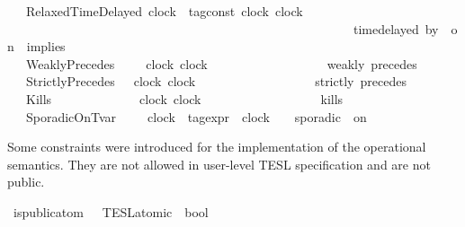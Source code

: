 \begin{isabellebody}
\ \ {\isacharbar}\ RelaxedTimeDelayed\ {\isacartoucheopen}clock{\isacartoucheclose}\ {\isacartoucheopen}{\isacharprime}{\isasymtau}\ tag{\isacharunderscore}const{\isacartoucheclose}\ {\isacartoucheopen}clock{\isacartoucheclose}\ {\isacartoucheopen}clock{\isacartoucheclose}\isanewline
\ \ \ \ \ \ \ \ \ \ \ \ \ \ \ \ \ \ \ \ \ \ \ \ \ \ \ \ \ \ \ \ \ \ \ \ \ \ \ \ \ \ \ \ \ \ \ \ \ \ \ \ \ \ {\isacharparenleft}{\isacartoucheopen}{\isacharunderscore}\ time{\isacharminus}delayed{\isasymbowtie}\ by\ {\isacharunderscore}\ on\ {\isacharunderscore}\ implies\ {\isacharunderscore}{\isacartoucheclose}\ {}{}{\isacharparenright}\isanewline
\ \ {\isacharbar}\ WeaklyPrecedes\ \ \ \ \ {\isacartoucheopen}clock{\isacartoucheclose}\ {\isacartoucheopen}clock{\isacartoucheclose}\ \ \ \ \ \ \ \ \ \ \ \ \ \ \ \ \ \ {\isacharparenleft}\ {\isacartoucheopen}weakly\ precedes{\isacartoucheclose}\ {}{}{\isacharparenright}\isanewline
\ \ {\isacharbar}\ StrictlyPrecedes\ \ \ {\isacartoucheopen}clock{\isacartoucheclose}\ {\isacartoucheopen}clock{\isacartoucheclose}\ \ \ \ \ \ \ \ \ \ \ \ \ \ \ \ \ \ {\isacharparenleft}\ {\isacartoucheopen}strictly\ precedes{\isacartoucheclose}\ {}{}{\isacharparenright}\isanewline
\ \ {\isacharbar}\ Kills\ \ \ \ \ \ \ \ \ \ \ \ \ \ {\isacartoucheopen}clock{\isacartoucheclose}\ {\isacartoucheopen}clock{\isacartoucheclose}\ \ \ \ \ \ \ \ \ \ \ \ \ \ \ \ \ \ {\isacharparenleft}\ {\isacartoucheopen}kills{\isacartoucheclose}\ {}{}{\isacharparenright}\isanewline
%
\isanewline
\ \ {\isacharbar}\ SporadicOnTvar\ \ \ \ \ {\isacartoucheopen}clock{\isacartoucheclose}\ {\isacartoucheopen}{\isacharprime}{\isasymtau}\ tag{\isacharunderscore}expr{\isacartoucheclose}\ \ {\isacartoucheopen}clock{\isacartoucheclose}\ \ \ {\isacharparenleft}{\isacartoucheopen}{\isacharunderscore}\ sporadic{\isasymsharp}\ {\isacharunderscore}\ on\ {\isacharunderscore}{\isacartoucheclose}\ {}{}{\isacharparenright}%
\begin{isamarkuptext}%
Some constraints were introduced for the implementation of the operational semantics.
  They are not allowed in user-level TESL specification and are not public.%
\end{isamarkuptext}\isamarkuptrue%
\isamarkupfalse%
\ is{\isacharunderscore}public{\isacharunderscore}atom\ {\isacharcolon}{\isacharcolon}\ {\isacartoucheopen}{\isacharprime}{\isasymtau}\ TESL{\isacharunderscore}atomic\ {\isasymRightarrow}\ bool{\isacartoucheclose}\ \isanewline

\end{isabellebody}
